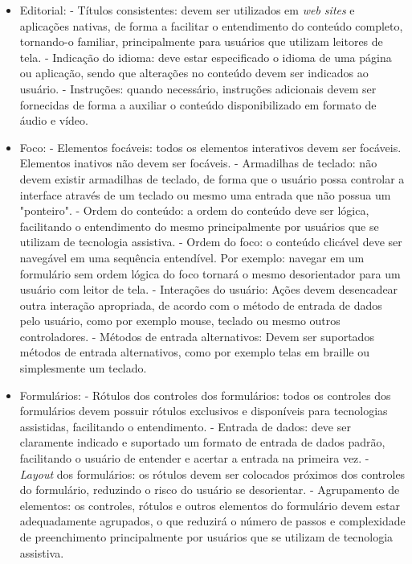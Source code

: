 \begin{itemize}
	\item Editorial:
		\subitem - Títulos consistentes: devem ser utilizados em \textit{web sites} e aplicações nativas, de forma a facilitar o entendimento do conteúdo completo, tornando-o familiar, principalmente para usuários que utilizam leitores de tela.
		\subitem - Indicação do idioma: deve estar especificado o idioma de uma página ou aplicação, sendo que alterações no conteúdo devem ser indicados ao usuário.
		\subitem - Instruções: quando necessário, instruções adicionais devem ser fornecidas de forma a auxiliar o conteúdo disponibilizado em formato de áudio e vídeo.
	\item Foco:
		\subitem - Elementos focáveis: todos os elementos interativos devem ser focáveis. Elementos inativos não devem ser focáveis.
		\subitem - Armadilhas de teclado: não devem existir armadilhas de teclado, de forma que o usuário possa controlar a interface através de um teclado ou mesmo uma entrada que não possua um "ponteiro".
		\subitem - Ordem do conteúdo: a ordem do conteúdo deve ser lógica, facilitando o entendimento do mesmo principalmente por usuários que se utilizam de tecnologia assistiva.
		\subitem - Ordem do foco: o conteúdo clicável deve ser navegável em uma sequência entendível. Por exemplo: navegar em um formulário sem ordem lógica do foco tornará o mesmo desorientador para um usuário com leitor de tela.
		\subitem - Interações do usuário: Ações devem desencadear outra interação apropriada, de acordo com o método de entrada de dados pelo usuário, como por exemplo mouse, teclado ou mesmo outros controladores.
		\subitem - Métodos de entrada alternativos: Devem ser suportados métodos de entrada alternativos, como por exemplo telas em braille ou simplesmente um teclado.
	\item Formulários:
		\subitem - Rótulos dos controles dos formulários: todos os controles dos formulários devem possuir rótulos exclusivos e disponíveis para tecnologias assistidas, facilitando o entendimento.
		\subitem - Entrada de dados: deve ser claramente indicado e suportado um formato de entrada de dados padrão, facilitando o usuário de entender e acertar a entrada na primeira vez.
		\subitem - \textit{Layout} dos formulários: os rótulos devem ser colocados próximos dos controles do formulário, reduzindo o risco do usuário se desorientar.
		\subitem - Agrupamento de elementos: os controles, rótulos e outros elementos do formulário devem estar adequadamente agrupados, o que reduzirá o número de passos e complexidade de preenchimento principalmente por usuários que se utilizam de tecnologia assistiva.

\end{itemize}

